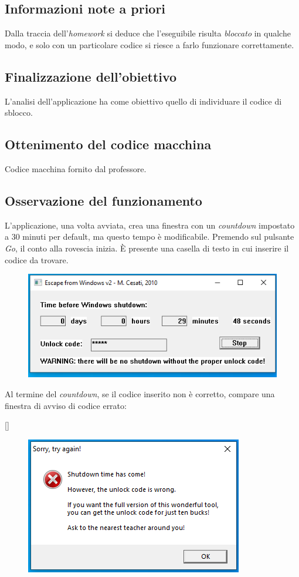 \documentclass[a4paper, 12pt]{article}
\newcommand{\makesub}[1]{%
  \saveexpandmode\noexpandarg
  \StrSubstitute{#1}{\_}{_}[\temp]%
  \restoreexpandmode
}
\newcommand{\target}[1]{%
  \makesub{#1}%
  \hypertarget{\temp}{}%
}
\begin{document}
\subsection{Informazioni note a priori}
Dalla traccia dell'\emph{homework} si deduce che l'eseguibile risulta \emph{bloccato} in qualche modo, e solo con un particolare codice si riesce a farlo funzionare correttamente.

\subsection{Finalizzazione dell'obiettivo}
L'analisi dell'applicazione ha come obiettivo quello di individuare il codice di sblocco.

\subsection{Ottenimento del codice macchina}
Codice macchina fornito dal professore.


\subsection{Osservazione del funzionamento}
L'applicazione, una volta avviata, crea una finestra con un \emph{countdown} impostato a 30 minuti per default, ma questo tempo è modificabile. Premendo sul pulsante \emph{Go}, il conto alla rovescia inizia. È presente una casella di testo in cui inserire il codice da trovare. 
\begin{figure}[H]
\centering\includegraphics[scale=0.4]{lauch_of_program}
\end{figure}
Al termine del \emph{countdown}, se il codice inserito non è corretto, compare una finestra di avviso di codice errato:

\target{dialogo}
\begin{figure}[H]
\centering\includegraphics[scale=0.4]{error_code_ad}
\end{figure}
\end{document}

